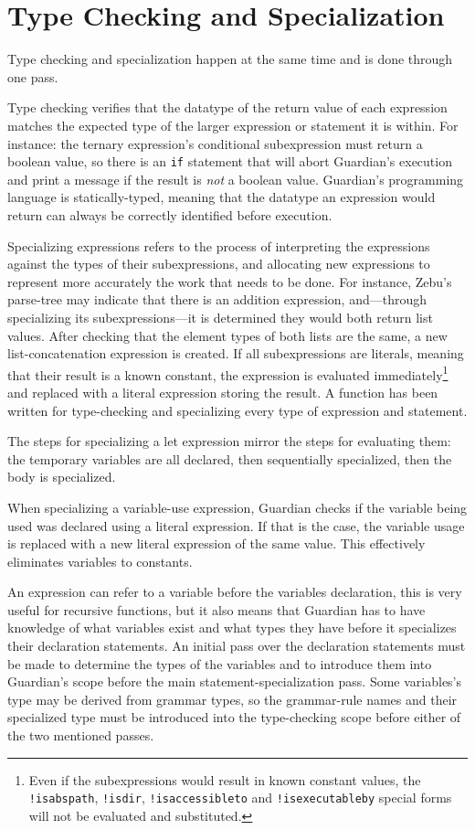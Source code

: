 
\section{Type Checking and Specialization}
{
	Type checking and specialization happen at the same time and is done
	through one pass.
	
	Type checking verifies that the datatype of the return value of each
	expression matches the expected type of the larger
	expression or statement it is within. For instance: the ternary
	expression's conditional subexpression
	must return a boolean value, so there is an \texttt{if} statement that will
	abort Guardian's execution and print a message if the result
	is \textit{not} a boolean value.
	Guardian's programming language is statically-typed, meaning
	that the datatype an expression would return can always be correctly
	identified before execution.
	
	Specializing expressions refers to the process
	of interpreting the expressions
	against the types of their subexpressions, and allocating new expressions
	to represent more accurately the work that needs to be done.
	For instance, Zebu's parse-tree may
	indicate that there is an addition expression, and---through specializing
	its subexpressions---it is determined they would both return
	list values. After checking that the element types of both lists are the
	same, a new list-concatenation expression is created.
	If all subexpressions are literals, meaning that their result is a known
	constant, the expression is evaluated immediately\footnote{Even if
	the subexpressions would result in known constant values, the
	\texttt{!isabspath}, \texttt{!isdir}, \texttt{!isaccessibleto}
	and \texttt{!isexecutableby} special forms will not be evaluated and
	substituted.} and replaced with a literal expression storing the result.
	A function has been written for type-checking and specializing every
	type of expression and statement.
	
	The steps for specializing a let expression mirror the steps for
	evaluating them: the temporary variables are all declared, then sequentially
	specialized, then the body is specialized.
	
	When specializing a variable-use expression, Guardian checks if the
	variable being used was declared using a literal expression. If that
	is the case, the variable usage is replaced with a new literal expression
	of the same value. This effectively eliminates variables to constants.
	
	An expression can refer to a variable before the variables declaration,
	this is very useful for recursive functions, but it also means that
	Guardian has to have knowledge of what variables exist and what
	types they have before it
	specializes their declaration statements. An initial pass over
	the declaration statements
	must be made to determine the types of the variables and to introduce them
	into Guardian's scope before the main
	statement-specialization pass. Some variables's type may be derived from
	grammar types, so the grammar-rule names and their specialized type must
	be introduced into the type-checking scope before either of the two
	mentioned passes.
	
}
